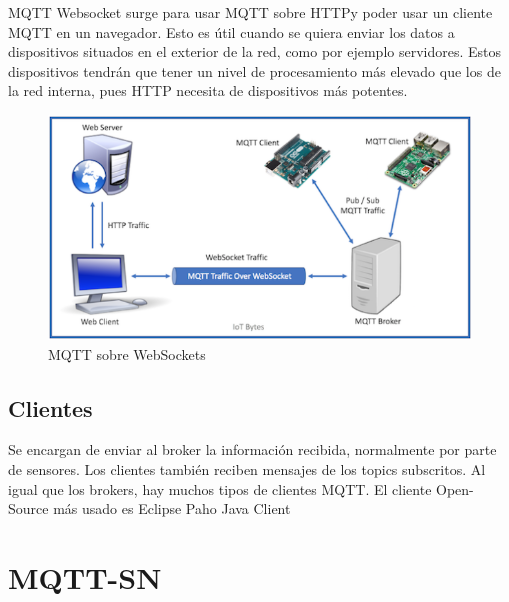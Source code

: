 \documentclass[12pt, twoside]{book}
\begin{document}
MQTT Websocket surge para usar MQTT sobre HTTPy poder usar un cliente MQTT en un navegador. Esto es útil cuando se quiera enviar los datos a dispositivos situados en el exterior de la red, como por ejemplo servidores. Estos dispositivos tendrán que tener un nivel de procesamiento más elevado que los de la red interna, pues HTTP necesita de dispositivos más potentes. 
\begin{figure}[H]
\centering
\includegraphics[scale=0.7]{images/mqtt_over_websockets}
\caption{MQTT sobre WebSockets}\label{L409}
\end{figure}
\subsection*{Clientes}
Se encargan de enviar al broker la información recibida, normalmente por parte de sensores. Los clientes también reciben mensajes de los topics subscritos.
Al igual que los brokers, hay muchos tipos de clientes MQTT. El cliente Open-Source más usado es Eclipse Paho Java Client \cite{paho}
\section{MQTT-SN}
\end{document}
